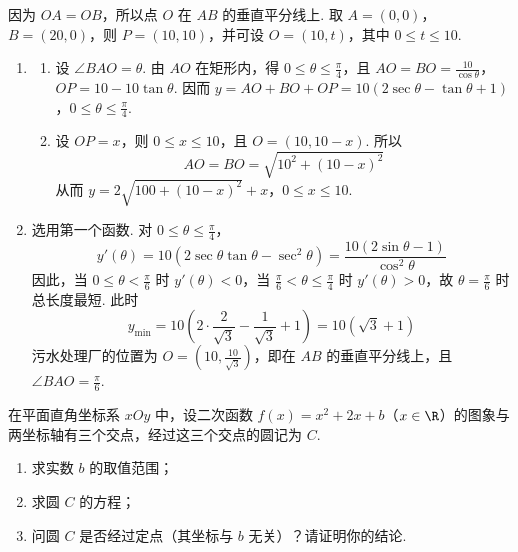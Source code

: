 \begin{solution}
因为 \(OA=OB\)，所以点 \(O\) 在 \(AB\) 的垂直平分线上. 取 \(A=(0,0)\)，\(B=(20,0)\)，则 \(P=(10,10)\)，并可设 \(O=(10,t)\)，其中 \(0\leqslant t\leqslant10\).

\begin{enumerate}
\item
\begin{enumerate}
\item 设 \(\angle BAO=\theta\). 由 \(AO\) 在矩形内，得 \(0\leqslant\theta\leqslant\frac{\pi}{4}\)，且
\(AO=BO=\frac{10}{\cos\theta}\)，\(OP=10-10\tan\theta\). 因而
\(y=AO+BO+OP=10\left(2\sec\theta-\tan\theta+1\right)\)，\(0\leqslant\theta\leqslant\frac{\pi}{4}\).

\item 设 \(OP=x\)，则 \(0\leqslant x\leqslant10\)，且 \(O=(10,10-x)\). 所以
\[
AO=BO=\sqrt{10^2+(10-x)^2}
\]
从而
\(y=2\sqrt{100+(10-x)^2}+x\)，\(0\leqslant x\leqslant10\).

\end{enumerate}
\item 选用第一个函数. 对 \(0\leqslant\theta\leqslant\frac{\pi}{4}\)，
\[
y'(\theta)=10\left(2\sec\theta\tan\theta-\sec^2\theta\right)=\frac{10(2\sin\theta-1)}{\cos^2\theta}
\]
因此，当 \(0\leqslant\theta<\frac{\pi}{6}\) 时 \(y'(\theta)<0\)，当 \(\frac{\pi}{6}<\theta\leqslant\frac{\pi}{4}\) 时 \(y'(\theta)>0\)，故 \(\theta=\frac{\pi}{6}\) 时总长度最短. 此时
\[
y_{\min}=10\left(2\cdot\frac{2}{\sqrt{3}}-\frac{1}{\sqrt{3}}+1\right)=10(\sqrt{3}+1)
\]
污水处理厂的位置为 \(O=(10,\frac{10}{\sqrt{3}})\)，即在 \(AB\) 的垂直平分线上，且 \(\angle BAO=\frac{\pi}{6}\).
\end{enumerate}
\end{solution}

\begin{problem}
在平面直角坐标系 \(xOy\) 中，设二次函数 \(f(x) = x^2 + 2x + b\)（\(x \in \R\)）的图象与两坐标轴有三个交点，经过这三个交点的圆记为 \(C\).

\begin{enumerate}
\item 求实数 \(b\) 的取值范围；
\item 求圆 \(C\) 的方程；
\item 问圆 \(C\) 是否经过定点（其坐标与 \(b\) 无关）？请证明你的结论.
\end{enumerate}
\end{problem}

